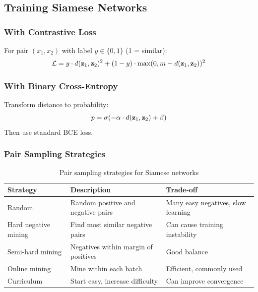 \subsection{Training Siamese Networks}

\subsubsection{With Contrastive Loss}

For pair $(x_1, x_2)$ with label $y \in \{0, 1\}$ (1 = similar):
\begin{equation}
\mathcal{L} = y \cdot d(\mathbf{z}_1, \mathbf{z}_2)^2 + (1-y) \cdot \max(0, m - d(\mathbf{z}_1, \mathbf{z}_2))^2
\end{equation}

\subsubsection{With Binary Cross-Entropy}

Transform distance to probability:
\begin{equation}
p = \sigma(-\alpha \cdot d(\mathbf{z}_1, \mathbf{z}_2) + \beta)
\end{equation}
Then use standard BCE loss.

\subsubsection{Pair Sampling Strategies}

\begin{table}[H]
\centering
\caption{Pair sampling strategies for Siamese networks}
\begin{tabularx}{\textwidth}{lXX}
\toprule
\textbf{Strategy} & \textbf{Description} & \textbf{Trade-off} \\
\midrule
Random & Random positive and negative pairs & Many easy negatives, slow learning \\
Hard negative mining & Find most similar negative pairs & Can cause training instability \\
Semi-hard mining & Negatives within margin of positives & Good balance \\
Online mining & Mine within each batch & Efficient, commonly used \\
Curriculum & Start easy, increase difficulty & Can improve convergence \\
\bottomrule
\end{tabularx}
\end{table}


